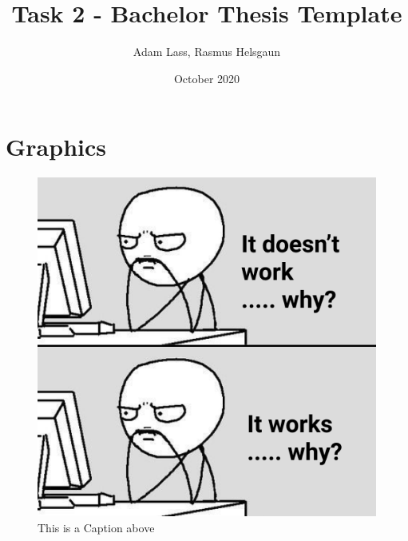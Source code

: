 \documentclass[12pt]{article}
\title{Task 2 - Bachelor Thesis Template}
\author{Adam Lass, Rasmus Helsgaun}
\date{October 2020}
\begin{document}
\clearpage\maketitle
\thispagestyle{empty}

\pagebreak
\tableofcontents

\pagebreak
\section{Graphics}


\begin{figure}[H]
  \caption{This is a Caption above \label{figure:cap-above}}
  \includegraphics[width=\textwidth]{img}
\end{figure}
\end{document}
